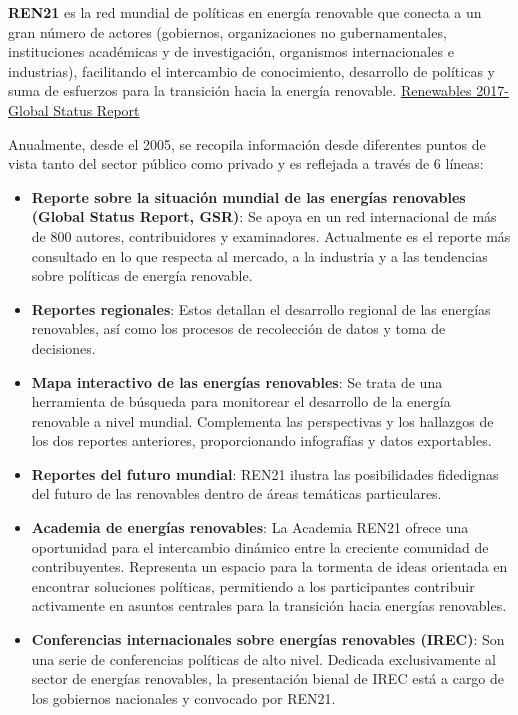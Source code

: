 \textbf{REN21} es la red mundial de políticas en energía renovable que
conecta a un gran número de actores (gobiernos, organizaciones no
gubernamentales, instituciones académicas y de investigación, organismos
internacionales e industrias), facilitando el intercambio de
conocimiento, desarrollo de políticas y suma de esfuerzos para la
transición hacia la energía renovable.
\href{http://www.ren21.net/wp-content/uploads/2017/06/17-8399_GSR_2017_Full_Report_0621_Opt.pdf}{Renewables
2017-Global Status Report}

Anualmente, desde el 2005, se recopila información desde diferentes
puntos de vista tanto del sector público como privado y es reflejada a
través de 6 líneas:

\begin{itemize}
\item
  \textbf{Reporte sobre la situación mundial de las energías renovables
  (Global Status Report, GSR)}: Se apoya en un red internacional de más
  de 800 autores, contribuidores y examinadores. Actualmente es el
  reporte más consultado en lo que respecta al mercado, a la industria y
  a las tendencias sobre políticas de energía renovable.
\item
  \textbf{Reportes regionales}: Estos detallan el desarrollo regional de
  las energías renovables, así como los procesos de recolección de datos
  y toma de decisiones.
\item
  \textbf{Mapa interactivo de las energías renovables}: Se trata de una
  herramienta de búsqueda para monitorear el desarrollo de la energía
  renovable a nivel mundial. Complementa las perspectivas y los
  hallazgos de los dos reportes anteriores, proporcionando infografías y
  datos exportables. 
\item
  \textbf{Reportes del futuro mundial}: REN21 ilustra las posibilidades
  fidedignas del futuro de las renovables dentro de áreas temáticas
  particulares.
\item
  \textbf{Academia de energías renovables}: La Academia REN21 ofrece una
  oportunidad para el intercambio dinámico entre la creciente comunidad
  de contribuyentes. Representa un espacio para la tormenta de ideas
  orientada en encontrar soluciones políticas, permitiendo a los
  participantes contribuir activamente en asuntos centrales para la
  transición hacia energías renovables.
\item
  \textbf{Conferencias internacionales sobre energías renovables
  (IREC)}: Son una serie de conferencias políticas de alto nivel.
  Dedicada exclusivamente al sector de energías renovables, la
  presentación bienal de IREC está a cargo de los gobiernos nacionales y
  convocado por REN21.
\end{itemize}

